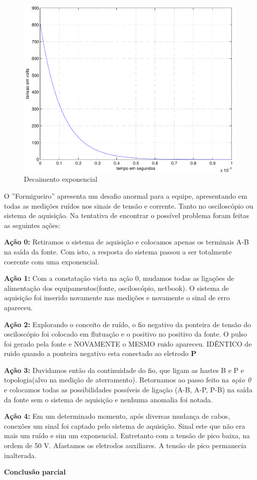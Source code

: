 \documentclass[paper=a4, fontsize=11pt]{article}
\begin{document}
\begin{figure}[!ht]
    \centering
    \includegraphics[scale=0.6]{expone.pdf}
    \caption{Decaimento exponencial}
\end{figure}

O ''Formigueiro'' apresenta um desafio anormal para a equipe, apresentando em todas as 
medições ruídos nos sinais de tensão e corrente. Tanto no osciloscópio ou sistema de 
aquisição. Na tentativa de encontrar o possível problema foram feitas as seguintes ações:

\textbf{Ação 0:} Retiramos o sistema de aquisição e colocamos apenas os terminais A-B na saída
da fonte. Com isto, a resposta do sistema passou a ser totalmente coerente com uma 
exponencial. 

\textbf{Ação 1:} Com a constatação vista na ação 0, mudamos todas as ligações de alimentação
dos equipamentos(fonte, osciloscópio, netbook). O sistema de aquisição foi inserido 
novamente nas medições e novamente o sinal de erro apareceu.

\textbf{Ação 2:} Explorando o conceito de ruído, o fio negativo da ponteira de tensão do
osciloscópio foi colocado em flutuação e o positivo no positivo da fonte. O pulso foi 
gerado pela fonte e NOVAMENTE o MESMO ruido apareceu. IDÊNTICO de ruido quando a ponteira
negativo esta conectado ao eletrodo \textbf{P}

\textbf{Ação 3:} Duvidamos então da continuidade do fio, que ligam as hastes B e P e 
topologia(alvo na medição de aterramento). Retornamos ao passo feito na \textit{ação 0}
e colocamos todas as possibilidades possíveis de ligação (A-B, A-P, P-B) na saída da fonte
sem o sistema de aquisição e nenhuma anomalia foi notada.

\textbf{Ação 4:} Em um determinado momento, após diversas mudança de cabos, conexões um 
sinal foi captado pelo sistema de aquisição. Sinal este que não era mais um ruído e sim
um exponencial. Entretanto com a tensão de pico baixa, na ordem de 50 V. Afastamos
os eletrodos auxiliares. A tensão de pico permanecia inalterada.

\textbf{Conclusão parcial}
\end{document}
